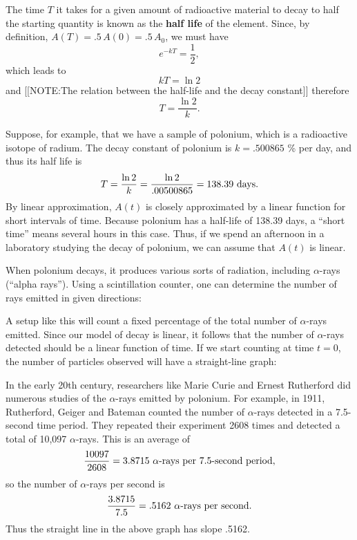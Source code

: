 The time $T$ it takes for a given amount of radioactive material to
decay to half the starting quantity is known as the {\bf half
  life} of the element.  Since, by definition,
$A(T)=.5\,A(0)=.5\,A_0$, we must have
\[
e^{-kT}=\dfrac{1}{2},
\]
which leads to
\[
kT=\ln{2}
\]
and 
[[NOTE:The relation between the half-life and  the decay constant]]
therefore
\[
T=\dfrac{\ln{2}}{k}.
\]

Suppose, for example, that we have a sample of
polonium, which is a radioactive isotope of
radium. The decay constant of polonium is $k = .500865$
\% per day, and thus its half life is
\[
T = \dfrac{{\ln2}}{k} = \dfrac{{\ln2}}{.00500865} 
   = 138.39\ \hbox{days}.
\]
By linear approximation, $A(t)$ is closely approximated by a linear
function for short intervals of time.  Because polonium has a
half-life of 138.39 days, a ``short time'' means several hours in this
case.  Thus, if we spend an afternoon in a laboratory studying the
decay of polonium, we can assume that $A(t)$ is linear.

When polonium decays, it produces various sorts of
radiation, including $\alpha$-rays (``alpha rays'').
Using a scintillation counter, one can determine the number of rays
emitted in given directions:




A setup like this will count a fixed percentage of the total number of
$\alpha$-rays emitted.  Since our model of decay is linear, it follows that the number of $\alpha$-rays
detected should be a linear function of time.  If we start counting at
time $t = 0$, the number of particles observed will have a
straight-line graph:\label{linear}



\enlargethispage*{10pt}
In the early 20th century, researchers like Marie Curie and Ernest Rutherford did numerous studies
of the $\alpha$-rays emitted by polonium.  For example, in 1911,
Rutherford, Geiger and Bateman counted
the number of $\alpha$-rays detected in a 7.5-second time period.
They repeated their experiment 2608 times and detected a total of
10,097 $\alpha$-rays.  This is an average of
\[
\dfrac{10097}{2608} = 3.8715\ \hbox{$\alpha$-rays per 7.5-second period},
\]
so the number of $\alpha$-rays per second is 
\[
\dfrac{3.8715}{7.5} = .5162\ \hbox{$\alpha$-rays per second}.
\]
Thus the straight line in the above graph has slope .5162.



